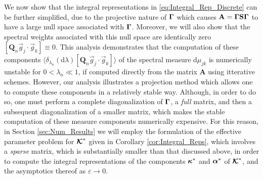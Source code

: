 \documentclass[11pt]{amsart}
\renewcommand{\d}{\mathrm{d}}
\newcommand{\Sb}{\mathbf{S}}
\newcommand{\Ab}{\mathbf{A}}
\newcommand{\Qb}{\mathbf{Q}}
\newcommand\Kbc{\mbox{\boldmath${\mathcal{K}}$}}
\newcommand\balpha{\mbox{\boldmath${\alpha}$}}
\newcommand\bkappa{\mbox{\boldmath${\kappa}$}}
\newcommand\bGamma{\mbox{\boldmath${\Gamma}$}}
\begin{document}
We now show that the integral representations in
\eqref{eq:Integral_Rep_Discrete} can be further 
simplified, due to the projective nature of $\bGamma$ which causes
$\Ab=\bGamma\Sb\bGamma$ to have a large null space associated with
$\bGamma$. Moreover, we will also show that the spectral weights
associated with this null space are identically zero
$[\Qb_n\vec{g}_j\cdot\vec{g}_k]\equiv0$. This analysis demonstrates that the
computation of these components
$\langle\delta_{\lambda_n}(\d\lambda)[\Qb_n\vec{g}_j\cdot\vec{g}_k]\rangle$ of the spectral measure
$\d\mu_{jk}$ is numerically unstable for $0<\lambda_n\ll1$, 
if computed directly from the matrix $\Ab$ using itterative
schemes. However, our analysis illustrates a projection method which 
allows one to compute these components in a relatively stable
way. Although, in order to do so, one must perform a complete
diagonalization of $\bGamma$, a \emph{full} matrix, and then a
subsequent diagonalization of a smaller matrix, which makes the
stable computation of these measure components numerically
expensive. For this reason, in Section \ref{sec:Num_Results} we will
employ the formulation of the effective parameter problem for $\Kbc^*$
given in Corollary \ref{cor:Integral_Reps}, which involves a
\emph{sparse} matrix, which is substantially smaller than that
discussed above, in order to 
compute the integral representations of the components $\bkappa^*$ and
$\balpha^*$ of $\Kbc^*$, and the asymptotics thereof as $\varepsilon\to0$.  
\end{document}
